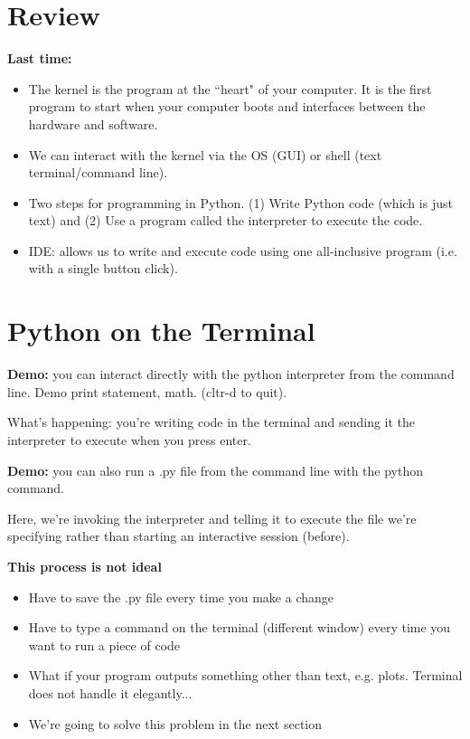 \documentclass[12pt]{article}
\numberwithin{equation}{section}
\begin{document}
\section{Review}

\textbf{Last time:}
\begin{itemize}
    \item The kernel is the program at the ``heart" of your computer. It is the first program to start when your computer boots and interfaces between the hardware and software.
    \item We can interact with the kernel via the OS (GUI) or shell (text terminal/command line).
    \item Two steps for programming in Python. (1) Write Python code (which is just text) and (2) Use a program called the interpreter to execute the code.
    \item IDE: allows us to write and execute code using one all-inclusive program (i.e. with a single button click).
\end{itemize}

\section{Python on the Terminal}
\textbf{Demo:} you can interact directly with the python interpreter from the command line. Demo print statement, math. (cltr-d to quit).

What's happening: you're writing code in the terminal and sending it the interpreter to execute when you press enter.

\textbf{Demo:} you can also run a .py file from the command line with the python command. 

Here, we're invoking the interpreter and telling it to execute the file we're specifying rather than starting an interactive session (before).

\textbf{This process is not ideal}

\begin{itemize}
    \item Have to save the .py file every time you make a change
    \item Have to type a command on the terminal (different window) every time you want to run a piece of code
    \item What if your program outputs something other than text, e.g. plots. Terminal does not handle it elegantly...
    \item We're going to solve this problem in the next section
\end{itemize}
\end{document}
